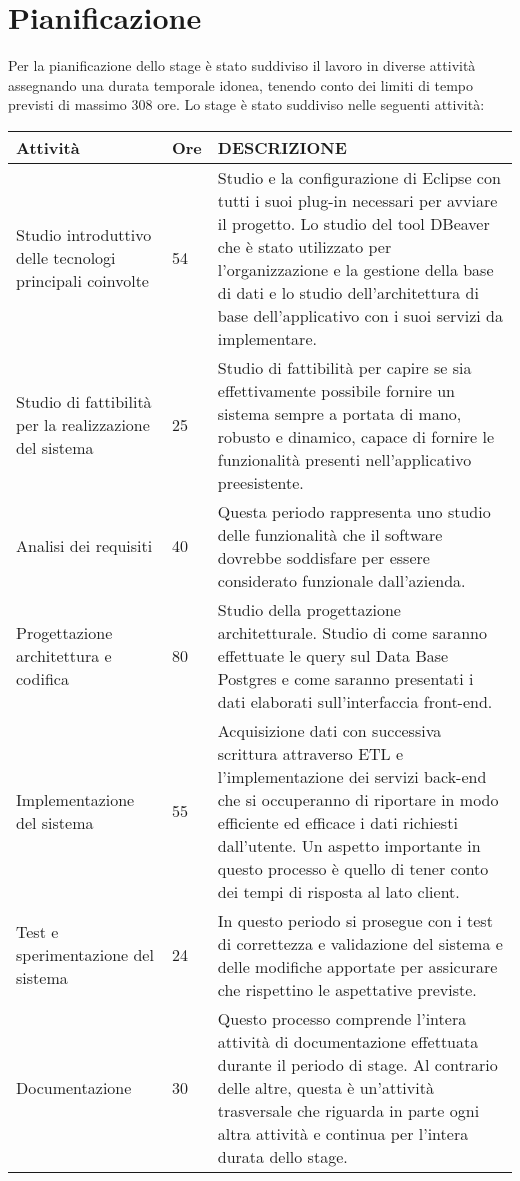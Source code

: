 \begin{table}
\section{Pianificazione}

Per la pianificazione dello stage è stato suddiviso il lavoro in diverse attività assegnando una durata temporale idonea, tenendo conto dei limiti di tempo previsti di massimo 308 ore. Lo stage è stato suddiviso nelle seguenti attività: \\

\begin{tabular}{ |p{3cm}|p{1cm}|p{8cm}| }

 \hline
\textbf{Attività}   &  \textbf{Ore}    &  \textbf{DESCRIZIONE} \\ 

 \hline
  Studio introduttivo delle tecnologi principali coinvolte &  54 & Studio e la configurazione di Eclipse con tutti i suoi \gls{plug-in} necessari per avviare il progetto. Lo studio del tool DBeaver che è stato utilizzato per l'organizzazione e la gestione della base di dati e lo studio dell'architettura di base dell'applicativo con i suoi servizi da implementare.\\
 \hline
Studio di fattibilità per la realizzazione del sistema &   25  & Studio di fattibilità per capire se sia effettivamente possibile fornire un sistema sempre a portata di mano, robusto e dinamico, capace di fornire le funzionalità  presenti nell'applicativo preesistente. \\
 \hline
 Analisi dei requisiti &   40  & Questa periodo rappresenta uno studio delle funzionalità che il software dovrebbe soddisfare per essere considerato funzionale dall'azienda. \\
 \hline
  Progettazione architettura e codifica &   80  & Studio della progettazione architetturale. Studio di come saranno effettuate le query sul Data Base Postgres e come saranno presentati i dati elaborati sull'interfaccia front-end.  \\
 \hline
   Implementazione del sistema &   55  & Acquisizione dati con successiva scrittura attraverso ETL e l'implementazione dei servizi back-end che si occuperanno di riportare in modo efficiente ed efficace i dati richiesti dall'utente. Un aspetto importante in questo processo è quello di tener conto dei tempi di risposta al lato client.  \\
 \hline
   Test e sperimentazione del sistema &   24  & In questo periodo si prosegue con i test di correttezza e validazione del sistema e delle modifiche apportate per assicurare che rispettino le aspettative previste.  \\
 \hline
    Documentazione&   30  & Questo  processo comprende l'intera attività di documentazione effettuata durante il periodo di stage. Al contrario delle altre, questa è un'attività trasversale che riguarda in parte ogni altra attività e continua per l'intera durata dello stage.  \\
 \hline


\end{tabular}
\end{table}
